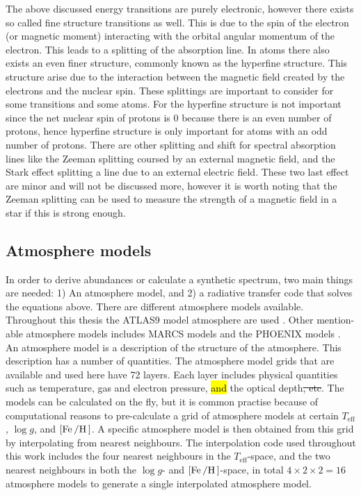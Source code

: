 The above discussed energy transitions are purely electronic, however there exists so called fine
structure transitions as well. This is due to the spin of the electron (or magnetic moment)
interacting with the orbital angular momentum of the electron. This leads to a splitting of the
absorption line. In atoms there also exists an even finer structure, commonly known as the hyperfine
structure. This structure arise due to the interaction between the magnetic field created by the
electrons and the nuclear spin. These splittings are important to consider for some transitions and
some atoms. For  the hyperfine structure is not important since the net nuclear spin of
protons is 0 because there is an even number of protons, hence hyperfine structure is only important
for atoms with an odd number of protons. There are other splitting and shift for spectral absorption
lines like the Zeeman splitting coursed by an external magnetic field, and the Stark effect
splitting a line due to an external electric field. These two last effect are minor and will not be
discussed more, however it is worth noting that the Zeeman splitting can be used to measure the
strength of a magnetic field in a star if this is strong enough.



\subsection{Atmosphere models}
\label{sec:atmospheremodels}

In order to derive abundances or calculate a synthetic spectrum, two main things are needed: 1) An
atmosphere model, and 2) a radiative transfer code that solves the equations above. There are
different atmosphere models available. Throughout this thesis the ATLAS9 model atmosphere are used
\citep{Kurucz1993}. Other mention-able atmosphere models includes MARCS models \citep{Gustafson2008}
and the PHOENIX models \citep{Husser2013}. An atmosphere model is a description of the structure of
the atmosphere. This description has a number of quantities. The atmosphere model grids that are
available and used here have 72 layers. Each layer includes physical quantities such as temperature,
gas and electron pressure, \hl{and} the optical depth\st{, etc}. The models can be calculated on the
fly, but it is common practise because of computational reasons to pre-calculate a grid of
atmosphere models at certain $T_\mathrm{eff}$, $\log g$, and $[\ion{Fe}/\ion{H}]$. A specific
atmosphere model is then obtained from this grid by interpolating from nearest neighbours. The
interpolation code used throughout this work includes the four nearest neighbours in the
$T_\mathrm{eff}$-space, and the two nearest neighbours in both the $\log g$- and
$[\ion{Fe}/\ion{H}]$-space, in total $4\times2\times2=16$ atmosphere models to generate a single
interpolated atmosphere model.




